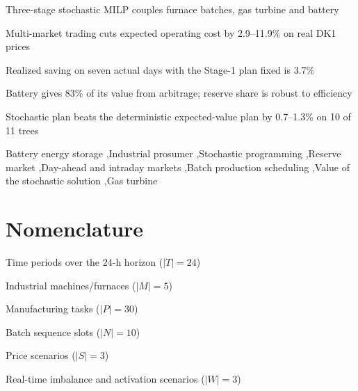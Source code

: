 \documentclass[5p,times,twocolumn]{elsarticle}
\newenvironment{nomlist}{%
  \begingroup\footnotesize
  \list{}{%
    \setlength{\labelwidth}{0.27\columnwidth}%
    \setlength{\labelsep}{4pt}%
    \setlength{\leftmargin}{\dimexpr\labelwidth+\labelsep\relax}%
    \setlength{\itemsep}{0.5pt}\setlength{\parsep}{0pt}%
    \setlength{\topsep}{1pt}\setlength{\partopsep}{0pt}%
    \renewcommand{\makelabel}[1]{##1\hfil}}%
}{\endlist\endgroup}
\newcommand{\nomheading}[1]{%
  \Needspace{4\baselineskip}%
  \par\vspace{3pt}\noindent{\footnotesize\bfseries\itshape #1}\par\vspace{1pt}}
\newcommand{\nomitem}[2]{\item[#1] #2}
\begin{document}
\begin{frontmatter}
\begin{highlights}
\item Three-stage stochastic MILP couples furnace batches, gas turbine and battery
\item Multi-market trading cuts expected operating cost by 2.9--11.9\% on real DK1 prices
\item Realized saving on seven actual days with the Stage-1 plan fixed is 3.7\%
\item Battery gives 83\% of its value from arbitrage; reserve share is robust to efficiency
\item Stochastic plan beats the deterministic expected-value plan by 0.7--1.3\% on 10 of 11 trees
\end{highlights}

\begin{keyword}
Battery energy storage \sep Industrial prosumer \sep Stochastic programming \sep Reserve market \sep Day-ahead and intraday markets \sep Batch production scheduling \sep Value of the stochastic solution \sep Gas turbine
\end{keyword}

\end{frontmatter}


\section*{Nomenclature}

\nomheading{Sets and indices}
\begin{nomlist}
\nomitem{$t\in T$}{Time periods over the 24-h horizon ($|T|=24$)}
\nomitem{$m\in M$}{Industrial machines/furnaces ($|M|=5$)}
\nomitem{$p\in P$}{Manufacturing tasks ($|P|=30$)}
\nomitem{$n\in N$}{Batch sequence slots ($|N|=10$)}
\nomitem{$s\in S$}{Price scenarios ($|S|=3$)}
\nomitem{$w\in W$}{Real-time imbalance and activation scenarios ($|W|=3$)}
\end{nomlist}
\end{document}
